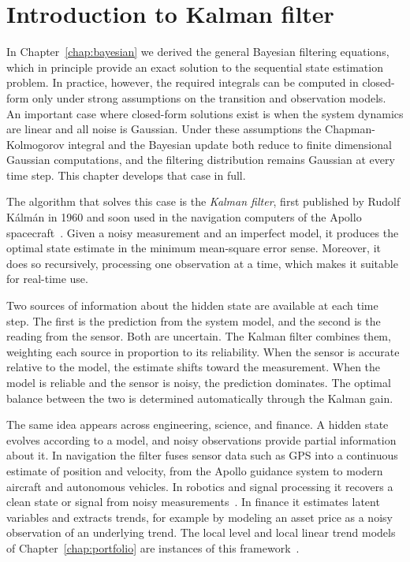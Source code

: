 \section{Introduction to Kalman filter}
In Chapter~\ref{chap:bayesian} we derived the general Bayesian filtering equations, which in principle provide an exact solution to the sequential state estimation problem. In practice, however, the required integrals can be computed in closed-form only under strong assumptions on the transition and observation models. An important case where closed-form solutions exist is when the system dynamics are linear and all noise is Gaussian. Under these assumptions the Chapman-Kolmogorov integral and the Bayesian update both reduce to finite dimensional Gaussian computations, and the filtering distribution remains Gaussian at every time step. This chapter develops that case in full.

The algorithm that solves this case is the \textit{Kalman filter}, first published by Rudolf Kálmán in 1960 and soon used in the navigation computers of the Apollo spacecraft~\cite[Preface]{labbe:kalman_and_bayesian_filters}. Given a noisy measurement and an imperfect model, it produces the optimal state estimate in the minimum mean-square error sense. Moreover, it does so recursively, processing one observation at a time, which makes it suitable for real-time use.

Two sources of information about the hidden state are available at each time step. The first is the prediction from the system model, and the second is the reading from the sensor. Both are uncertain. The Kalman filter combines them, weighting each source in proportion to its reliability. When the sensor is accurate relative to the model, the estimate shifts toward the measurement. When the model is reliable and the sensor is noisy, the prediction dominates. The optimal balance between the two is determined automatically through the Kalman gain.

The same idea appears across engineering, science, and finance. A hidden state evolves according to a model, and noisy observations provide partial information about it. In navigation the filter fuses sensor data such as GPS into a continuous estimate of position and velocity, from the Apollo guidance system to modern aircraft and autonomous vehicles. In robotics and signal processing it recovers a clean state or signal from noisy measurements~\cite[Ch.~1.1]{sarkka:bayesian_filtering}. In finance it estimates latent variables and extracts trends, for example by modeling an asset price as a noisy observation of an underlying trend. The local level and local linear trend models of Chapter~\ref{chap:portfolio} are instances of this framework~\cite[Ch.~4]{palomar:portfolio_optimization}.


